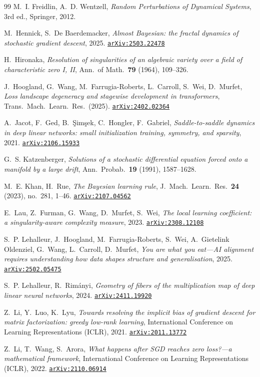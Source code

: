 \documentclass[11pt]{amsart}
\newcommand{\arxiv}[1]{\href{https://arxiv.org/abs/#1}{\texttt{arXiv:#1}}}
\theoremstyle{plain}
\theoremstyle{definition}
\begin{document}
\begin{thebibliography}{99}
M.~I. Freidlin, A.~D. Wentzell,
\emph{Random Perturbations of Dynamical Systems},
3rd ed., Springer, 2012.

M.~Hennick, S.~De Baerdemacker,
\emph{Almost Bayesian: the fractal dynamics of stochastic gradient descent},
2025. \arxiv{2503.22478}

H.~Hironaka,
\emph{Resolution of singularities of an algebraic variety over a field of characteristic zero I, II},
Ann.\ of Math.\ \textbf{79} (1964), 109--326.

J.~Hoogland, G.~Wang, M.~Farrugia-Roberts, L.~Carroll, S.~Wei, D.~Murfet,
\emph{Loss landscape degeneracy and stagewise development in transformers},
Trans.\ Mach.\ Learn.\ Res.\ (2025). \arxiv{2402.02364}

A.~Jacot, F.~Ged, B.~\c{S}im\c{s}ek, C.~Hongler, F.~Gabriel,
\emph{Saddle-to-saddle dynamics in deep linear networks: small initialization training, symmetry, and sparsity},
2021. \arxiv{2106.15933}

G.~S. Katzenberger,
\emph{Solutions of a stochastic differential equation forced onto a manifold by a large drift},
Ann.\ Probab.\ \textbf{19} (1991), 1587--1628.

M.~E. Khan, H.~Rue,
\emph{The Bayesian learning rule},
J.\ Mach.\ Learn.\ Res.\ \textbf{24} (2023), no.\ 281, 1--46.
\arxiv{2107.04562}

E.~Lau, Z.~Furman, G.~Wang, D.~Murfet, S.~Wei,
\emph{The local learning coefficient: a singularity-aware complexity measure},
2023. \arxiv{2308.12108}

S.~P. Lehalleur, J.~Hoogland, M.~Farrugia-Roberts, S.~Wei, A.~Gietelink Oldenziel, G.~Wang, L.~Carroll, D.~Murfet,
\emph{You are what you eat---AI alignment requires understanding how data shapes structure and generalisation},
2025. \arxiv{2502.05475}

S.~P. Lehalleur, R.~Rim\'anyi,
\emph{Geometry of fibers of the multiplication map of deep linear neural networks},
2024. \arxiv{2411.19920}

Z.~Li, Y.~Luo, K.~Lyu,
\emph{Towards resolving the implicit bias of gradient descent for matrix factorization: greedy low-rank learning},
International Conference on Learning Representations (ICLR), 2021.
\arxiv{2011.13772}

Z.~Li, T.~Wang, S.~Arora,
\emph{What happens after SGD reaches zero loss?---a mathematical framework},
International Conference on Learning Representations (ICLR), 2022.
\arxiv{2110.06914}


\end{thebibliography}
\end{document}
